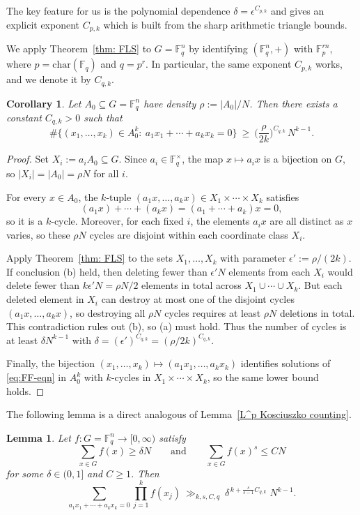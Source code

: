 \documentclass[A4paper,reqno,oneside,12pt]{amsart}
\theoremstyle{plain}
\newtheorem{lemma}[theorem]{Lemma}
\newtheorem{corollary}[theorem]{Corollary}
\theoremstyle{definition}
\newcommand{\F}{\mathbb{F}}
\begin{document}
The key feature for us is the polynomial dependence $\delta=\epsilon^{C_{p,k}}$ and 
\cite{FLS} gives an explicit exponent $C_{p,k}$ which is built from the sharp
arithmetic triangle bounds.

We apply Theorem~\ref{thm: FLS} to $G=\F_q^n$ by identifying $(\F_q^n,+)$ with $\F_p^{rn}$, where $p=\mathrm{char}(\F_q)$ and $q=p^r$.
In particular, the same exponent $C_{p,k}$ works, and we denote it by $C_{q,k}$.

\begin{corollary}\label{cor:FF-supersat}
Let $A_0\subseteq G=\F_q^n$ have density $\rho:=|A_0|/N$. Then there exists a constant $C_{q,k}>0$ such that
\[
\#\{(x_1,\dots,x_k)\in A_0^k:\ a_1x_1+\cdots+a_kx_k=0\}
\ \ge\
\Big(\frac{\rho}{2k}\Big)^{C_{q,k}}\,N^{k-1}.
\]
\end{corollary}

\begin{proof}
Set $X_i:=a_iA_0\subseteq G$. Since $a_i\in\F_q^\times$, the map $x\mapsto a_ix$ is a bijection on $G$, so
$|X_i|=|A_0|=\rho N$ for all $i$.

For every $x\in A_0$, the $k$-tuple $(a_1x,\dots,a_kx)\in X_1\times\cdots\times X_k$ satisfies
\[
(a_1x)+\cdots+(a_kx)=(a_1+\cdots+a_k)x=0,
\]
so it is a $k$-cycle. Moreover, for each fixed $i$, the elements $a_ix$ are all distinct as $x$ varies,
so these $\rho N$ cycles are disjoint within each coordinate class $X_i$.

Apply Theorem~\ref{thm: FLS} to the sets $X_1,\dots,X_k$ with parameter $\epsilon':=\rho/(2k)$.
If conclusion (b) held, then deleting fewer than $\epsilon'N$ elements from each $X_i$ would delete fewer than
$k\epsilon'N=\rho N/2$ elements in total across $X_1\cup\cdots\cup X_k$.
But each deleted element in $X_i$ can destroy at most one of the disjoint cycles $(a_1x,\dots,a_kx)$,
so destroying all $\rho N$ cycles requires at least $\rho N$ deletions in total. This contradiction rules out (b), so (a) must hold.
Thus the number of cycles is at least $\delta N^{k-1}$ with $\delta=(\epsilon')^{C_{q,k}}=(\rho/2k)^{C_{q,k}}$.

Finally, the bijection $(x_1,\dots,x_k)\mapsto(a_1x_1,\dots,a_kx_k)$ identifies solutions of \eqref{eq:FF-eqn}
in $A_0^k$ with $k$-cycles in $X_1\times\cdots\times X_k$, so the same lower bound holds.
\end{proof}

The following lemma is a direct analogous of Lemma~\ref{L^p Kosciuszko counting}.

\begin{lemma}\label{lem:FF-Roth-count}
Let $f: G= \F_q^n\to[0,\infty)$ satisfy
\[
\sum_{x\in G} f(x)\ge \delta N
\qquad\text{and}\qquad
\sum_{x\in G} f(x)^s\le C N
\]
for some $\delta\in(0,1]$ and $C\ge 1$. Then
\[
\sum_{a_1x_1+\cdots+a_kx_k=0}\prod_{j=1}^k f(x_j)
\ \gg_{k,s,C,q}\
\delta^{\,k+\frac{s}{s-1}C_{q,k}}\;N^{k-1}.
\]
\end{lemma}
\end{document}
